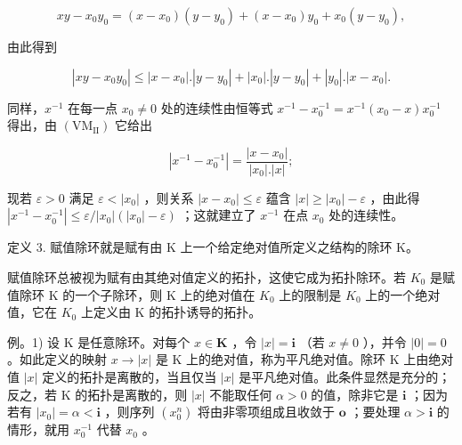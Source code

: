 \[
x y - x _ {0} y _ {0} = (x - x _ {0}) (y - y _ {0}) + (x - x _ {0}) y _ {0} + x _ {0} (y - y _ {0}),
\]

由此得到

\[
\left| x y - x _ {0} y _ {0} \right| \leqslant \left| x - x _ {0} \right|. \left| y - y _ {0} \right| + \left| x _ {0} \right|. \left| y - y _ {0} \right| + \left| y _ {0} \right|. \left| x - x _ {0} \right|.
\]

同样，\(x^{-1}\) 在每一点 \(x_{0} \neq 0\) 处的连续性由恒等式 \(x^{-1} - x_{0}^{-1} = x^{-1} (x_{0} - x)x_{0}^{-1}\) 得出，由 \((\mathrm{VM}_{\mathrm{II}})\) 它给出

\[
\left| x ^ {- 1} - x _ {0} ^ {- 1} \right| = \frac {\left| x - x _ {0} \right|}{\left| x _ {0} \right| . \left| x \right|};
\]

现若 \(\varepsilon > 0\) 满足 \(\varepsilon < |x_0|\) ，则关系 \(|x - x_0| \leqslant \varepsilon\) 蕴含 \(|x| \geqslant |x_0| - \varepsilon\) ，由此得 \(|x^{-1} - x_{0}^{-1}| \leqslant \varepsilon / |x_0| (|x_0| - \varepsilon)\) ；这就建立了 \(x^{-1}\) 在点 \(x_0\) 处的连续性。

定义 3. 赋值除环就是赋有由 K 上一个给定绝对值所定义之结构的除环 K。

赋值除环总被视为赋有由其绝对值定义的拓扑，这使它成为拓扑除环。若 \(K_{0}\) 是赋值除环 K 的一个子除环，则 K 上的绝对值在 \(K_{0}\) 上的限制是 \(K_{0}\) 上的一个绝对值，它在 \(K_{0}\) 上定义由 K 的拓扑诱导的拓扑。

例。1) 设 K 是任意除环。对每个 \(x \in \mathbf{K}\) ，令 \(|x| = \mathbf{i}\) （若 \(x \neq 0\) ），并令 \(|0| = 0\) 。如此定义的映射 \(x \to |x|\) 是 K 上的绝对值，称为平凡绝对值。除环 K 上由绝对值 \(|x|\) 定义的拓扑是离散的，当且仅当 \(|x|\) 是平凡绝对值。此条件显然是充分的；反之，若 K 的拓扑是离散的，则 \(|x|\) 不能取任何 \(\alpha > 0\) 的值，除非它是 \(\mathbf{i}\) ；因为若有 \(|x_0| = \alpha < \mathbf{i}\) ，则序列 \((x_0^n)\) 将由非零项组成且收敛于 \(\mathbf{o}\) ；要处理 \(\alpha > \mathbf{i}\) 的情形，就用 \(x_0^{-1}\) 代替 \(x_0\) 。

